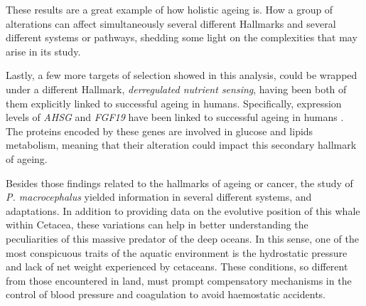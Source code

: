 These results are a great example of how holistic ageing is.
How a group of alterations can affect simultaneously several different Hallmarks and several different systems or pathways, shedding some light on the complexities that may arise in its study.

Lastly, a few more targets of selection showed in this analysis, could be wrapped under a different Hallmark, \textit{derregulated nutrient sensing}, having been both of them explicitly linked to successful ageing in humans.
Specifically, expression levels of \textit{AHSG} and \textit{FGF19} have been linked to successful ageing in humans \cite{Sanchis-Gomar2015}. 
The proteins encoded by these genes are involved in glucose and lipids metabolism, meaning that their alteration could impact this secondary hallmark of ageing.

Besides those findings related to the hallmarks of ageing or cancer, the study of \textit{P. macrocephalus} yielded information in several different systems, and adaptations.
In addition to providing data on the evolutive position of this whale within Cetacea, these variations can help in better understanding the peculiarities of this massive predator of the deep oceans.
In this sense, one of the most conspicuous traits of the aquatic environment is the hydrostatic pressure and lack of net weight experienced by cetaceans.
These conditions, so different from those encountered in land, must prompt compensatory mechanisms in the control of blood pressure and coagulation to avoid haemostatic accidents.

